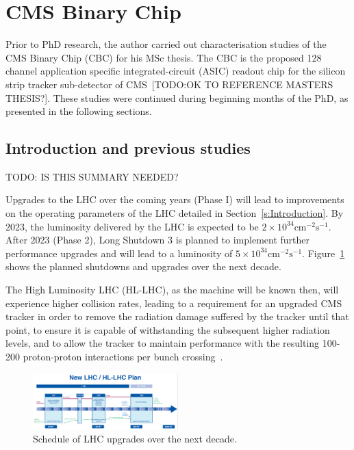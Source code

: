 \section{CMS Binary Chip}
\label{s:cbc}

Prior to PhD research, the author carried out characterisation studies of the CMS Binary Chip (CBC) for his
MSc thesis. The CBC is the proposed 128 channel application specific integrated-circuit (ASIC) readout chip for
the silicon strip tracker sub-detector of CMS~\cite{JacobJA}[TODO:OK TO REFERENCE MASTERS THESIS?]. These
studies were continued during beginning months of the PhD, as presented in the following sections.

\subsection{Introduction and previous studies}
\label{ss:introduction_and_previous_studies}
TODO: IS THIS SUMMARY NEEDED?

Upgrades to the LHC over the coming years (Phase I) will lead to improvements on the operating parameters of
the LHC detailed in Section~\ref{s:Introduction}. By 2023, the luminosity delivered by the LHC is expected to
be $2\times10^{34}\mathrm{cm^{-2}s^{-1}}$. After 2023 (Phase 2), Long Shutdown 3 is planned to implement
further performance upgrades and will lead to a luminosity of $5\times10^{34}\mathrm{cm^{-2}s^{-1}}$.
Figure~\ref{fig:lhc_upgrades} shows the planned shutdowns and upgrades over the next decade.

The High Luminosity LHC (HL-LHC), as the machine will be known then, will experience higher collision rates,
leading to a requirement for an upgraded CMS tracker in order to remove the radiation damage suffered by the
tracker until that point, to ensure it is capable of withstanding the subsequent higher radiation levels, and
to allow the tracker to maintain performance with the resulting 100-200 proton-proton interactions per bunch
crossing~\cite{Mersi:2011jv}.

\begin{figure}[ht] %
   \centering
     \includegraphics[width=0.5\textwidth]{Chapters/07_Appendices/07d_ServiceWork/Images/newlhcplan}\hfill
     \caption{Schedule of LHC upgrades over the next decade.}
     \label{fig:lhc_upgrades}
\end{figure}

